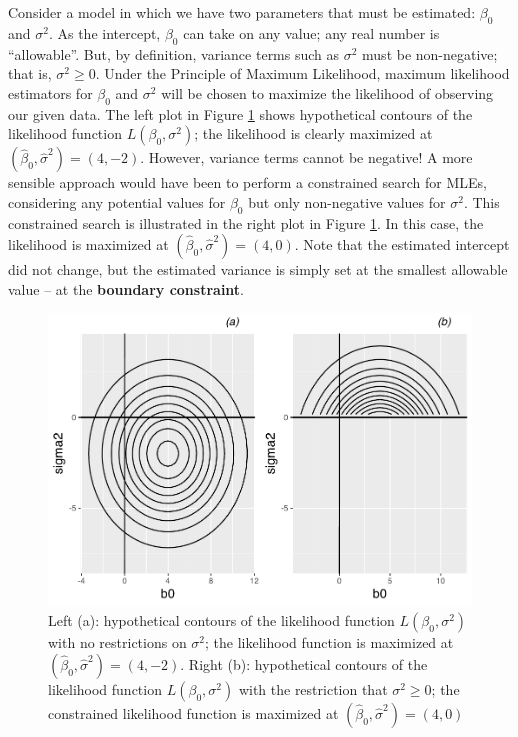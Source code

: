 \documentclass[
]{krantz}
\begin{document}
Consider a model in which we have two parameters that must be estimated: \(\beta_0\) and \(\sigma^2\). As the intercept, \(\beta_0\) can take on any value; any real number is ``allowable''. But, by definition, variance terms such as \(\sigma^2\) must be non-negative; that is, \(\sigma^2 \geq 0\). Under the Principle of Maximum Likelihood, maximum likelihood estimators for \(\beta_0\) and \(\sigma^2\) will be chosen to maximize the likelihood of observing our given data. The left plot in Figure \ref{fig:boundary} shows hypothetical contours of the likelihood function \(L(\beta_0, \sigma^2)\); the likelihood is clearly maximized at \((\hat{\beta}_0 , \hat{\sigma}^2)=(4,-2)\). However, variance terms cannot be negative! A more sensible approach would have been to perform a constrained search for MLEs, considering any potential values for \(\beta_0\) but only non-negative values for \(\sigma^2\). This constrained search is illustrated in the right plot in Figure \ref{fig:boundary}. In this case, the likelihood is maximized at \((\hat{\beta}_0 , \hat{\sigma}^2)=(4,0)\). Note that the estimated intercept did not change, but the estimated variance is simply set at the smallest allowable value -- at the \textbf{boundary constraint}.



\begin{figure}

{\centering \includegraphics[width=0.6\linewidth]{bookdown-BeyondMLR_files/figure-latex/boundary-1} 

}

\caption{Left (a): hypothetical contours of the likelihood function \(L(\beta_0, \sigma^2)\) with no restrictions on \(\sigma^2\); the likelihood function is maximized at \((\hat{\beta}_0, \hat{\sigma}^2)=(4,-2)\). Right (b): hypothetical contours of the likelihood function \(L(\beta_0, \sigma^2)\) with the restriction that \(\sigma^2 \geq 0\); the constrained likelihood function is maximized at \((\hat{\beta}_0, \hat{\sigma}^2)=(4,0)\)}\label{fig:boundary}
\end{figure}
\end{document}
